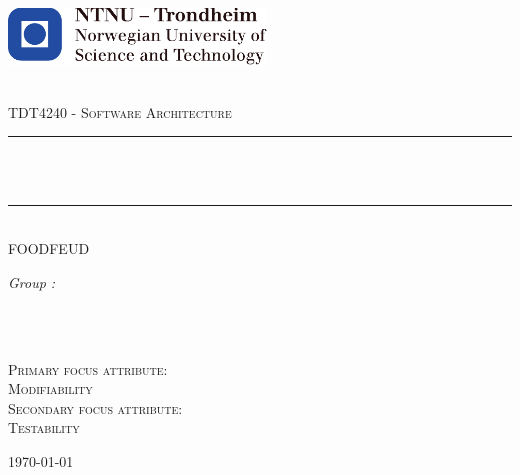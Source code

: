 \begin{titlepage}
\includegraphics[height=1.5cm]{images/ntnu_logo.pdf}\\[1cm]   
\begin{center}

 
~\\[1.5cm]

\textsc{\Large TDT4240 - Software Architecture}\\[0.5cm]

\hrule ~\\[0.2cm]
{\huge \bfseries \mytitle}\\[0.4cm]		%
\hrule ~\\[1.5cm]

\textsc{\Large FOODFEUD}\\[0.5cm]

\begin{minipage}{0.4\textwidth}
    \centering
	\large
		\emph{Group \mygroupnumber:}\\~\\
		\myauthor
\end{minipage}\\[0.5cm]



\begin{minipage}{0.4\textwidth}
    \centering
    \textsc{Primary focus attribute:\\Modifiability}\\[0.5cm]
    \textsc{Secondary focus attribute:\\Testability}\\[0.5cm]

\end{minipage}
\vfill
{\large \today}

\end{center}
\end{titlepage}